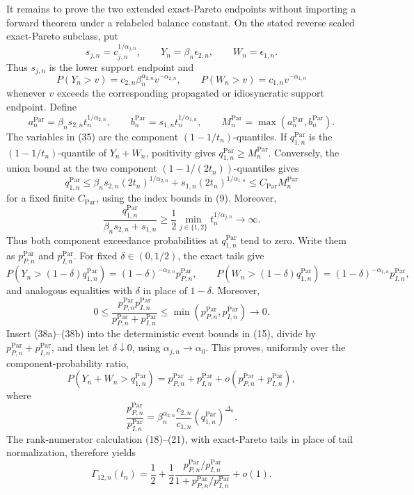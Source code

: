 It remains to prove the two extended exact-Pareto endpoints without importing
a forward theorem under a relabeled balance constant. On the stated reverse
scaled exact-Pareto subclass, put
\[
s_{j,n}=c_{j,n}^{1/\alpha_{j,n}},
\qquad
Y_n=\beta_n\epsilon_{2,n},
\qquad
W_n=\epsilon_{1,n}.
\tag{33}
\]
Thus \(s_{j,n}\) is the lower support endpoint and
\[
P(Y_n>v)=c_{2,n}\beta_n^{\alpha_{2,n}}v^{-\alpha_{2,n}},
\qquad
P(W_n>v)=c_{1,n}v^{-\alpha_{1,n}}
\tag{34}
\]
whenever \(v\) exceeds the corresponding propagated or idiosyncratic support
endpoint. Define
\[
a_n^{\mathrm{Par}}=\beta_n s_{2,n}t_n^{1/\alpha_{2,n}},
\qquad
b_n^{\mathrm{Par}}=s_{1,n}t_n^{1/\alpha_{1,n}},
\qquad
M_n^{\mathrm{Par}}=\max(a_n^{\mathrm{Par}},b_n^{\mathrm{Par}}).
\tag{35}
\]
The variables in (35) are the component \((1-1/t_n)\)-quantiles. If
\(q_{1,n}^{\mathrm{Par}}\) is the \((1-1/t_n)\)-quantile of \(Y_n+W_n\),
positivity gives \(q_{1,n}^{\mathrm{Par}}\geq M_n^{\mathrm{Par}}\). Conversely,
the union bound at the two component \((1-1/(2t_n))\)-quantiles gives
\[
q_{1,n}^{\mathrm{Par}}
\leq\beta_n s_{2,n}(2t_n)^{1/\alpha_{2,n}}
+s_{1,n}(2t_n)^{1/\alpha_{1,n}}
\leq C_{\mathrm{Par}}M_n^{\mathrm{Par}}
\tag{36}
\]
for a fixed finite \(C_{\mathrm{Par}}\), using the index bounds in (9).
Moreover,
\[
\frac{q_{1,n}^{\mathrm{Par}}}{\beta_n s_{2,n}+s_{1,n}}
\geq\frac12\min_{j\in\{1,2\}}t_n^{1/\alpha_{j,n}}
\longrightarrow\infty.
\tag{37}
\]
Thus both component exceedance probabilities at
\(q_{1,n}^{\mathrm{Par}}\) tend to zero. Write them as
\(p_{P,n}^{\mathrm{Par}}\) and \(p_{I,n}^{\mathrm{Par}}\). For fixed
\(\delta\in(0,1/2)\), the exact tails give
\[
P(Y_n>(1-\delta)q_{1,n}^{\mathrm{Par}})
=(1-\delta)^{-\alpha_{2,n}}p_{P,n}^{\mathrm{Par}},
\qquad
P(W_n>(1-\delta)q_{1,n}^{\mathrm{Par}})
=(1-\delta)^{-\alpha_{1,n}}p_{I,n}^{\mathrm{Par}},
\tag{38a}
\]
and analogous equalities with \(\delta\) in place of \(1-\delta\).
Moreover,
\[
0\leq
\frac{p_{P,n}^{\mathrm{Par}}p_{I,n}^{\mathrm{Par}}}
{p_{P,n}^{\mathrm{Par}}+p_{I,n}^{\mathrm{Par}}}
\leq\min(p_{P,n}^{\mathrm{Par}},p_{I,n}^{\mathrm{Par}})\longrightarrow0.
\tag{38b}
\]
Insert (38a)--(38b) into the deterministic event bounds in (15), divide by
\(p_{P,n}^{\mathrm{Par}}+p_{I,n}^{\mathrm{Par}}\), and then let
\(\delta\downarrow0\), using \(\alpha_{j,n}\to\alpha_0\). This proves,
uniformly over the component-probability ratio,
\[
P(Y_n+W_n>q_{1,n}^{\mathrm{Par}})
=p_{P,n}^{\mathrm{Par}}+p_{I,n}^{\mathrm{Par}}
+o(p_{P,n}^{\mathrm{Par}}+p_{I,n}^{\mathrm{Par}}),
\tag{38}
\]
where
\[
\frac{p_{P,n}^{\mathrm{Par}}}{p_{I,n}^{\mathrm{Par}}}
=\beta_n^{\alpha_{2,n}}\frac{c_{2,n}}{c_{1,n}}
(q_{1,n}^{\mathrm{Par}})^{\Delta_n}.
\tag{39}
\]
The rank-numerator calculation (18)--(21), with exact-Pareto tails in place of
tail normalization, therefore yields
\[
\Gamma_{12,n}(t_n)
=\frac12+\frac12
\frac{p_{P,n}^{\mathrm{Par}}/p_{I,n}^{\mathrm{Par}}}
{1+p_{P,n}^{\mathrm{Par}}/p_{I,n}^{\mathrm{Par}}}+o(1).
\tag{40}
\]

